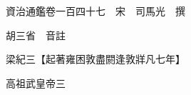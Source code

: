 










 


 
 


 

  
  
  
  
  





  
  
  
  
  
 
  

  

  
  
  



  

 
 

  
   




  

  
  


  　　資治通鑑卷一百四十七　宋　司馬光　撰

　　胡三省　音註

　　梁紀三【起著雍困敦盡閼逢敦牂凡七年】

　　高祖武皇帝三

